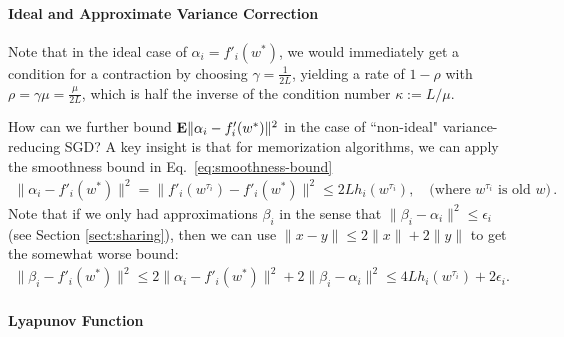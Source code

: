 \paragraph*{Ideal and Approximate Variance Correction}
 
Note that in the ideal case of $\alpha_i = f'_i(w^*)$, we would immediately get a condition for a contraction by choosing $\gamma = \frac{1}{2L}$, yielding a  rate of $1- \rho$ with $\rho = \gamma \mu = \frac{\mu}{2L}$, which is half the inverse of the condition number $\kappa:=L/\mu$.

%
%

How can we further bound  ${\mathbf E} \| \alpha_i - f_i'(w^*) \|^2$ in the case of ``non-ideal" variance-reducing SGD? A key insight is that for  memorization algorithms, we can apply the smoothness bound in Eq.~\eqref{eq:smoothness-bound}
\begin{align}
\| \alpha_i-f'_i(w^*)\|^2 
= \| f'_i(w^{\tau_i}) -f'_i(w^*)\|^2 
\le 2L  h_i(w^{\tau_i}), \quad \text{(where $w^{\tau_i}$ is old $w$)} \,.
\label{eq:alpha-bound}
\end{align}
Note that if we only had approximations $\beta_i$ in the sense that $\| \beta_i - \alpha_i \|^2 \le \epsilon_i$  (see Section \ref{sect:sharing}), then we can use $\|x-y\| \leq 2 \|x\| + 2 \|y\|$ to get the somewhat worse bound:
\begin{align}
\| \beta_i-f'_i(w^*)\|^2  \le 2\| \alpha_i-f'_i(w^*)\|^2  + 2 \| \beta_i - \alpha_i\|^2
\le 4L  h_i(w^{\tau_i})  + 2 \epsilon_i.
\label{eq:alpha-tilde-bound}
\end{align}


\paragraph*{Lyapunov Function}

